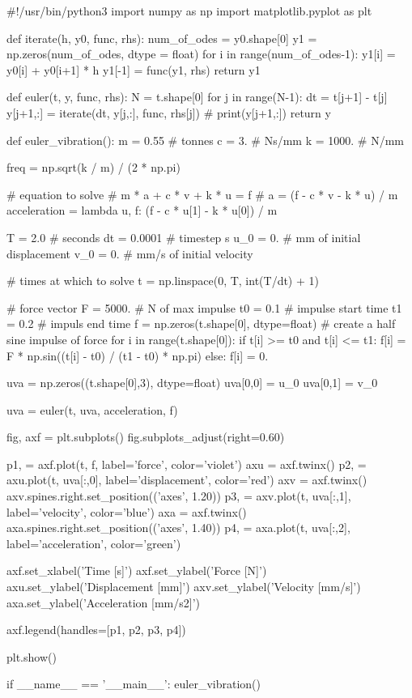 \documentclass[10pt,b5paper,titlepage]{book}
\begin{document}
\begin{python}
#!/usr/bin/python3
import numpy as np
import matplotlib.pyplot as plt


def iterate(h, y0, func, rhs):
    num_of_odes = y0.shape[0]
    y1 = np.zeros(num_of_odes, dtype = float)
    for i in range(num_of_odes-1):
        y1[i] = y0[i] + y0[i+1] * h
    y1[-1] = func(y1, rhs)
    return y1


def euler(t, y, func, rhs):
    N = t.shape[0]
    for j in range(N-1):
        dt = t[j+1] - t[j]
        y[j+1,:] = iterate(dt, y[j,:], func, rhs[j])
        # print(y[j+1,:])
    return y


def euler_vibration():
    m = 0.55  # tonnes
    c = 3.    # Ns/mm
    k = 1000. # N/mm

    freq = np.sqrt(k / m) / (2 * np.pi)

    # equation to solve
    # m * a + c * v + k * u = f
    # a = (f - c * v - k * u) / m
    acceleration = lambda u, f: (f - c * u[1] - k * u[0]) / m

    T = 2.0     # seconds
    dt = 0.0001 # timestep s
    u_0 = 0.    # mm of initial displacement
    v_0 = 0.    # mm/s of initial velocity

    # times at which to solve
    t = np.linspace(0, T, int(T/dt) + 1)

    # force vector
    F = 5000. # N of max impulse
    t0 = 0.1  # impulse start time
    t1 = 0.2  # impuls end time
    f = np.zeros(t.shape[0], dtype=float)
    # create a half sine impulse of force
    for i in range(t.shape[0]):
        if t[i] >= t0 and t[i] <= t1:
            f[i] = F * np.sin((t[i] - t0) / (t1 - t0) * np.pi)
        else:
            f[i] = 0.

    uva = np.zeros((t.shape[0],3), dtype=float)
    uva[0,0] = u_0
    uva[0,1] = v_0

    uva = euler(t, uva, acceleration, f)

    fig, axf = plt.subplots()
    fig.subplots_adjust(right=0.60)

    p1, = axf.plot(t, f, label='force', color='violet')
    axu = axf.twinx()
    p2, = axu.plot(t, uva[:,0], label='displacement', color='red')
    axv = axf.twinx()
    axv.spines.right.set_position(('axes', 1.20))
    p3, = axv.plot(t, uva[:,1], label='velocity', color='blue')
    axa = axf.twinx()
    axa.spines.right.set_position(('axes', 1.40))
    p4, = axa.plot(t, uva[:,2], label='acceleration', color='green')

    axf.set_xlabel('Time [s]')
    axf.set_ylabel('Force [N]')
    axu.set_ylabel('Displacement [mm]')
    axv.set_ylabel('Velocity [mm/s]')
    axa.set_ylabel('Acceleration [mm/s2]')

    axf.legend(handles=[p1, p2, p3, p4])

    plt.show()

if __name__ == '__main__':
    euler_vibration()

\end{python}
\end{document}
